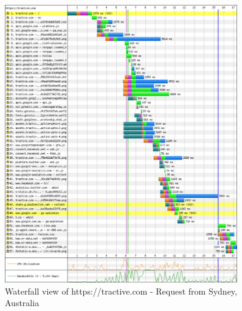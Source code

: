 \begin{figure}[h]
	\centering
		\includegraphics[width=0.9\textwidth]{imgs/webpagetest_old_sydney.png}
	\caption{Waterfall view of https://tractive.com - Request from Sydney, Australia}
	\label{fig:sydney_old}
\end{figure}

